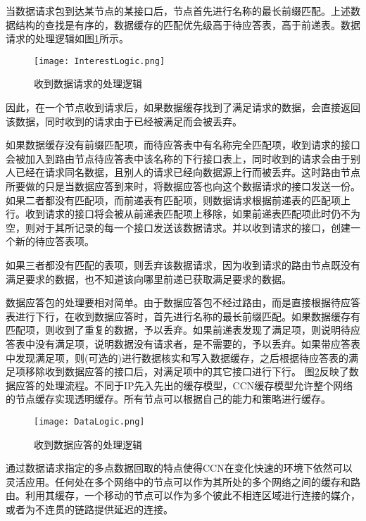 \par
当数据请求包到达某节点的某接口后，节点首先进行名称的最长前缀匹配。上述数据结构的查找是有序的，数据缓存的匹配优先级高于待应答表，高于前递表。数据请求的处理逻辑如图\ref{fig:InterestLogic}所示。
\begin{figure}[h!]
	\centering
	\texttt{[image: InterestLogic.png]}
	\caption{收到数据请求的处理逻辑}
	\label{fig:InterestLogic}
\end{figure}
\par
因此，在一个节点收到请求后，如果数据缓存找到了满足请求的数据，会直接返回该数据，同时收到的请求由于已经被满足而会被丢弃。
\par
如果数据缓存没有前缀匹配项，而待应答表中有名称完全匹配项，收到请求的接口会被加入到路由节点待应答表中该名称的下行接口表上，同时收到的请求会由于别人已经在请求同名数据，且别人的请求已经向数据源上行而被丢弃。这时路由节点所要做的只是当数据应答到来时，将数据应答也向这个数据请求的接口发送一份。
如果二者都没有匹配项，而前递表有匹配项，则数据请求根据前递表的匹配项上行。收到请求的接口将会被从前递表匹配项上移除，如果前递表匹配项此时仍不为空，则对于其所记录的每一个接口发送该数据请求。并以收到请求的接口，创建一个新的待应答表项。
\par
如果三者都没有匹配的表项，则丢弃该数据请求，因为收到请求的路由节点既没有满足要求的数据，也不知道该向哪里前递已获取满足要求的数据。
\par
数据应答包的处理要相对简单。由于数据应答包不经过路由，而是直接根据待应答表进行下行，在收到数据应答时，首先进行名称的最长前缀匹配。如果数据缓存有匹配项，则收到了重复的数据，予以丢弃。如果前递表发现了满足项，则说明待应答表中没有满足项，说明数据没有请求者，是不需要的，予以丢弃。如果带应答表中发现满足项，则(可选的)进行数据核实和写入数据缓存，之后根据待应答表的满足项移除收到数据应答的接口后，对满足项中的其它接口进行下行。
图\ref{fig:DataLogic}反映了数据应答的处理流程。不同于IP先入先出的缓存模型，CCN缓存模型允许整个网络的节点缓存实现透明缓存。所有节点可以根据自己的能力和策略进行缓存。
\begin{figure}[h!]
	\centering
	\texttt{[image: DataLogic.png]}
	\caption{收到数据应答的处理逻辑}
	\label{fig:DataLogic}
\end{figure}
\par
通过数据请求指定的多点数据回取的特点使得CCN在变化快速的环境下依然可以灵活应用。任何处在多个网络中的节点可以作为其所处的多个网络之间的缓存和路由。利用其缓存，一个移动的节点可以作为多个彼此不相连区域进行连接的媒介，或者为不连贯的链路提供延迟的连接。

